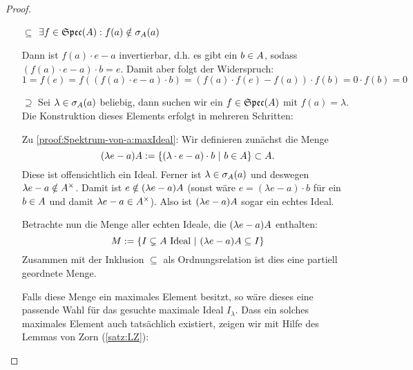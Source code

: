 \begin{proof}
\begin{itemize}
\item[\glqq$\subseteq$\grqq]%
 \Ann $\exists f \in \mathfrak{Spec}(A): f(a) \notin \sigma_A(a)$
	
Dann ist $f(a)\cdot e - a$ invertierbar, d.h. es gibt ein $b \in A$, sodass $(f(a)\cdot e - a)\cdot b =e$. Damit aber folgt der Widerspruch:
	\[1 = f(e) = f((f(a)\cdot e - a)\cdot b) = (f(a)\cdot f(e) - f(a))\cdot f(b) = 0\cdot f(b) = 0\]
	
\item[\glqq$\supseteq$\grqq]%
Sei $\lambda \in \sigma_A(a)$ beliebig, dann suchen wir ein $f \in \mathfrak{Spec}(A)$ mit $f(a) = \lambda$. Die Konstruktion dieses Elements erfolgt in mehreren Schritten:

Zu \ref{proof:Spektrum-von-a:maxIdeal}: 
Wir definieren zunächst die Menge
	\[(\lambda e-a)A := \{(\lambda\cdot e - a)\cdot b ~|~ b \in A\} \subset A. \] 
Diese ist offensichtlich ein Ideal. Ferner ist $\lambda \in \sigma_A(a)$ und deswegen $\lambda e-a \notin A^\times$. Damit ist $e \notin (\lambda e-a)A$ (sonst wäre $e = (\lambda e - a)\cdot b$ für ein $b \in A$ und damit $\lambda e-a \in A^\times$). Also ist $(\lambda e-a)A$ sogar ein echtes Ideal.

Betrachte nun die Menge aller echten Ideale, die $(\lambda e-a)A$ enthalten:
	\[M := \{I \subsetneq A \text{ Ideal} ~|~ (\lambda e-a)A \subseteq I\}\]
Zusammen mit der Inklusion $\subseteq$ als Ordnungsrelation ist dies eine partiell geordnete Menge. 

Falls diese Menge ein maximales Element besitzt, so wäre dieses eine passende Wahl für das gesuchte maximale Ideal $I_\lambda$. Dass ein solches maximales Element auch tatsächlich existiert, zeigen wir mit Hilfe des Lemmas von Zorn (\ref{satz:LZ}):


\end{itemize}
\end{proof}
